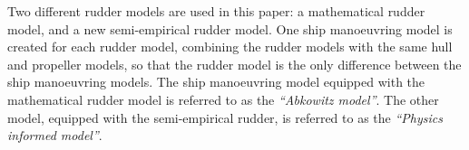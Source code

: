 Two different rudder models are used in this paper: a mathematical rudder model, and a new semi-empirical rudder model.
One ship manoeuvring model is created for each rudder model, combining the rudder models with the same hull and propeller models, so that the rudder model is the only difference between the ship manoeuvring models.
The ship manoeuvring model equipped with the mathematical rudder model is referred to as the \emph{``Abkowitz model''}. The other model, equipped with the semi-empirical rudder, is referred to as the \emph{``Physics informed model''}. 